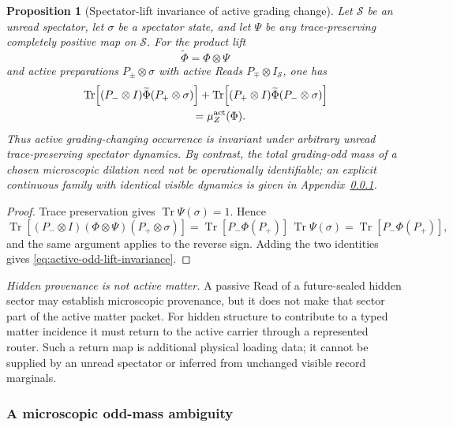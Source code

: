 \documentclass[11pt]{article}
\numberwithin{equation}{section}
\newtheorem{proposition}[theorem]{Proposition}
\theoremstyle{definition}
\theoremstyle{remark}
\newcommand{\Tr}{\operatorname{Tr}}
\begin{document}
\begin{proposition}[Spectator-lift invariance of active grading change]
\label{thm:active-odd-lift-invariance}
Let $\mathcal S$ be an unread spectator, let $\sigma$ be a spectator state, and
let $\Psi$ be any trace-preserving completely positive map on $\mathcal S$.
For the product lift
\[
\widetilde\Phi=\Phi\otimes\Psi
\]
and active preparations $P_\pm\otimes\sigma$ with active Reads
$P_\mp\otimes I_{\mathcal S}$, one has
\begin{equation}
\begin{aligned}
&\Tr\!\left[(P_-\otimes I)\widetilde\Phi(P_+\otimes\sigma)\right]
+\Tr\!\left[(P_+\otimes I)\widetilde\Phi(P_-\otimes\sigma)\right]\\
&\hspace{10em}=\mu_Z^{\rm act}(\Phi).
\end{aligned}
\label{eq:active-odd-lift-invariance}
\end{equation}
Thus active grading-changing occurrence is invariant under arbitrary unread
trace-preserving spectator dynamics.  By contrast, the total grading-odd mass
of a chosen microscopic dilation need not be operationally identifiable; an
explicit continuous family with identical visible dynamics is given in
Appendix~\ref{app:microscopic-odd-lift}.
\end{proposition}

\begin{proof}
Trace preservation gives $\Tr\Psi(\sigma)=1$.  Hence
\[
\Tr\!\left[(P_-\otimes I)(\Phi\otimes\Psi)(P_+\otimes\sigma)\right]
=
\Tr[P_-\Phi(P_+)]\,\Tr\Psi(\sigma)
=
\Tr[P_-\Phi(P_+)],
\]
and the same argument applies to the reverse sign.  Adding the two identities
gives \eqref{eq:active-odd-lift-invariance}.
\end{proof}

\noindent\textit{Hidden provenance is not active matter.} A passive Read of a future-sealed hidden sector may establish microscopic
provenance, but it does not make that sector part of the active matter packet.
For hidden structure to contribute to a typed matter incidence it must return
to the active carrier through a represented router.  Such a return map is
additional physical loading data; it cannot be supplied by an unread spectator
or inferred from unchanged visible record marginals.


\subsubsection{A microscopic odd-mass ambiguity}
\label{app:microscopic-odd-lift}
\end{document}
